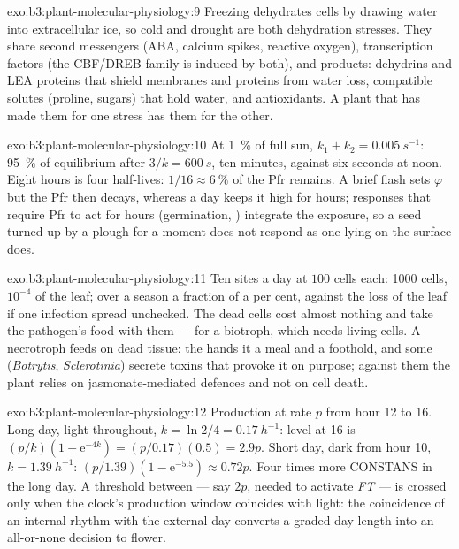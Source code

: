 \begin{solution}{exo:b3:plant-molecular-physiology:9}
Freezing dehydrates cells by drawing water into extracellular ice, so
cold and drought are both dehydration stresses. They share second
messengers (ABA, calcium spikes, reactive oxygen), transcription
factors (the CBF/DREB family is induced by both), and products:
dehydrins and LEA proteins that shield membranes and proteins from
water loss, compatible solutes (proline, sugars) that hold water, and
antioxidants. A plant that has made them for one stress has them for
the other.
\end{solution}

\begin{solution}{exo:b3:plant-molecular-physiology:10}
At \qty{1}{\%} of full sun, $k_{1} + k_{2} = \qty{0.005}{s^{-1}}$: 95~\%
of equilibrium after $3/k = \qty{600}{s}$, ten minutes, against six
seconds at noon. Eight hours is four half-lives: $1/16 \approx
\qty{6}{\%}$ of the Pfr remains. A brief flash sets $\varphi$ but the
Pfr then decays, whereas a day keeps it high for hours; responses that
require Pfr to act for hours (germination, ) integrate the
exposure, so a seed turned up by a plough for a moment does not respond
as one lying on the surface does.
\end{solution}

\begin{solution}{exo:b3:plant-molecular-physiology:11}
Ten sites a day at $100$ cells each: \num{1000} cells, $10^{-4}$ of the
leaf; over a season a fraction of a per cent, against the loss of the
leaf if one infection spread unchecked. The dead cells cost almost
nothing and take the pathogen's food with them --- for a biotroph,
which needs living cells. A necrotroph feeds on dead tissue: the
 hands it a meal and a foothold, and some
(\emph{Botrytis}, \emph{Sclerotinia}) secrete toxins that provoke it
on purpose; against them the plant relies on jasmonate-mediated
defences and not on cell death.
\end{solution}

\begin{solution}{exo:b3:plant-molecular-physiology:12}
Production at rate $p$ from hour 12 to 16. Long day, light throughout,
$k = \ln 2/4 = \qty{0.17}{h^{-1}}$: level at 16 is $(p/k)(1 -
\mathrm{e}^{-4k}) = (p/0.17)(0.5) = 2.9p$. Short day, dark from hour
10, $k = \qty{1.39}{h^{-1}}$: $(p/1.39)(1 - \mathrm{e}^{-5.5})
\approx 0.72p$. Four times more CONSTANS in the long day. A threshold
between --- say $2p$, needed to activate \emph{FT} --- is crossed only
when the clock's production window coincides with light: the
coincidence of an internal rhythm with the external day converts a
graded day length into an all-or-none decision to flower.
\end{solution}

